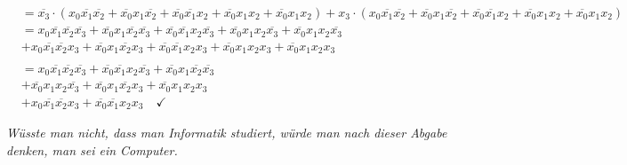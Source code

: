 \documentclass{article}
\newcommand{\nyet}{\overline}
\begin{document}
\begin{enumerate}
\begin{align*}
			&= \nyet{x_3} \cdot (x_0 \nyet{x_1} \nyet{x_2} + \nyet{x_0} x_1 \nyet{x_2} + \nyet{x_0} \nyet{x_1} x_2 + \nyet{x_0} x_1 x_2 + \nyet{x_0} x_1 x_2) + x_3 \cdot (x_0 \nyet{x_1} \nyet{x_2} + \nyet{x_0} x_1 \nyet{x_2} + \nyet{x_0} \nyet{x_1} x_2 + \nyet{x_0} x_1 x_2 + \nyet{x_0} x_1 x_2) \\
			&= x_0 \nyet{x_1} \nyet{x_2} \nyet{x_3} + \nyet{x_0} x_1 \nyet{x_2} \nyet{x_3} + \nyet{x_0} \nyet{x_1} x_2 \nyet{x_3} + \nyet{x_0} x_1 x_2 \nyet{x_3} + \nyet{x_0} x_1 x_2 \nyet{x_3} \\
			&+ x_0 \nyet{x_1} \nyet{x_2} x_3 + \nyet{x_0} x_1 \nyet{x_2} x_3 + \nyet{x_0} \nyet{x_1} x_2 x_3 + \nyet{x_0} x_1 x_2 x_3 + \nyet{x_0} x_1 x_2 x_3 \\\\
			&= x_0 \nyet{x_1} \nyet{x_2} \nyet{x_3} + \nyet{x_0} \nyet{x_1} x_2 \nyet{x_3} + \nyet{x_0} x_1 \nyet{x_2} \nyet{x_3} \\
			&+ \nyet{x_0} x_1 x_2 \nyet{x_3} + \nyet{x_0} x_1 \nyet{x_2} x_3 + \nyet{x_0} x_1 x_2 x_3 \\
			&+ x_0 \nyet{x_1} \nyet{x_2} x_3 + \nyet{x_0} \nyet{x_1} x_2 x_3 \quad \checkmark
		\end{align*}
	\end{enumerate}

	\newpage
	
	\textit{Wüsste man nicht, dass man Informatik studiert, würde man nach dieser Abgabe denken, man sei ein Computer.}
\end{document}
